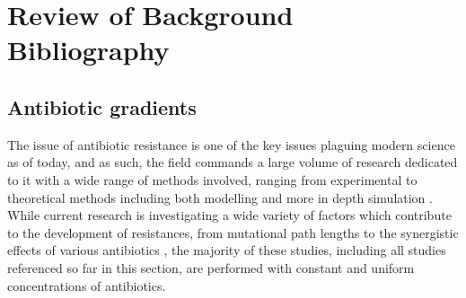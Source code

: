 \documentclass[a4paper,12pt]{article}
\begin{document}
\section{Review of Background Bibliography}


\subsection{Antibiotic gradients}
The issue of antibiotic resistance is one of the key issues plaguing modern science as of today, and as such, the field commands a 
large volume of research dedicated to it with a wide range of methods involved, ranging from experimental to theoretical methods including both modelling and 
more in depth simulation \cite{bioref:chait-interactions, bioref:Wang-treatment-tradeoff, bioref:Torella-optimal-drug-synergy}.  While current research is 
investigating a wide variety of factors which contribute to the development of resistances, from mutational path lengths \cite{bioref:marvig-transmiss-lineage} to 
the synergistic effects of various antibiotics \cite{bioref:Liu-baicalin-synergy}, the majority of these studies, including all studies referenced
so far in this section, are performed with constant and uniform concentrations of antibiotics.
\end{document}
